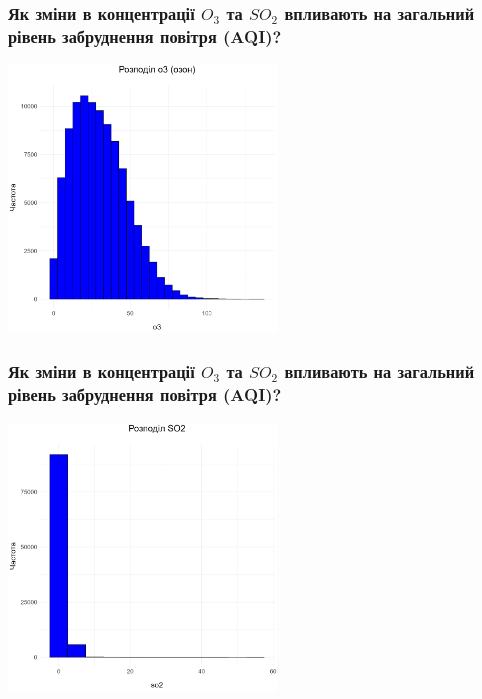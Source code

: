 \documentclass{beamer}
\begin{document}
\begin{frame}
  \frametitle{Як зміни в концентрації $O_3$ та $SO_2$ впливають на загальний рівень забруднення повітря (AQI)?}
  
  \begin{center}
    \includegraphics[height=2.8in]{plots/question2/o3_plot.png}
  \end{center}
\end{frame}

\begin{frame}
  \frametitle{Як зміни в концентрації $O_3$ та $SO_2$ впливають на загальний рівень забруднення повітря (AQI)?}

  \begin{center}
    \includegraphics[height=2.8in]{plots/question2/so2_plot.png}
  \end{center}
\end{frame}
\end{document}
